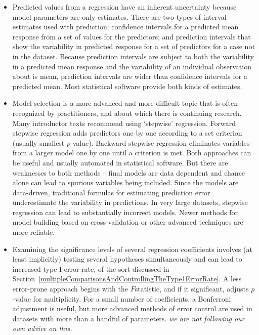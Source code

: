 \begin{itemize}
	
	\item Predicted values from a regression have an inherent uncertainty because model parameters are only estimates.  There are two types of interval estimates used with prediction: confidence intervals for a predicted mean response from a set of values for the predictors; and prediction intervals that show the variability in predicted response for a set of predictors for a case not in the dataset.  Because prediction intervals are subject to both the variability in a predicted mean response and the variability of an individual observation about is mean, prediction intervals are wider than confidence intervals for a predicted mean.  Most statistical software provide both kinds of estimates.
	
	\item Model selection is a more advanced and more difficult topic that is often recognized by practitioners, and about which there is continuing research.  Many introductor texts recommend using `stepwise' regression.  Forward stepwise regression adds predictors one by one according to a set criterion (usually smallest $p$-value).  Backward stepwise regression eliminates variables from a larger model one by one until a criterion is met. Both approaches can be useful and usually automated in statistical software.  But there are weaknesses to both methods -- final models are data dependent and chance alone can lead to spurious variables being included.  Since the models are data-driven, traditional formulas for estimating prediction error underestimate the variability in predictions. In very large datasets, stepwise regression can lead to substantially incorrect models. Newer methods for model building based on cross-validation or other advanced techniques are more reliable.
	
	\item  Examining the significance levels of several regression coefficients involves (at least implicitly) testing several hypotheses simultaneously and can lead to increased type I error rate, of the sort discussed in Section~\ref{multipleComparisonsAndControllingTheType1ErrorRate}.  A less error-prone approach begins with the $F$statistic, and if it significant, adjusts $p$-value for multiplicity. For a small number of coefficients, a Bonferroni adjustment is useful, but more advanced methods of error control are used in datasets with more than a handful of parameters.  \textit{we are not following our own advice on this.}
	
\end{itemize}


 





 
 
